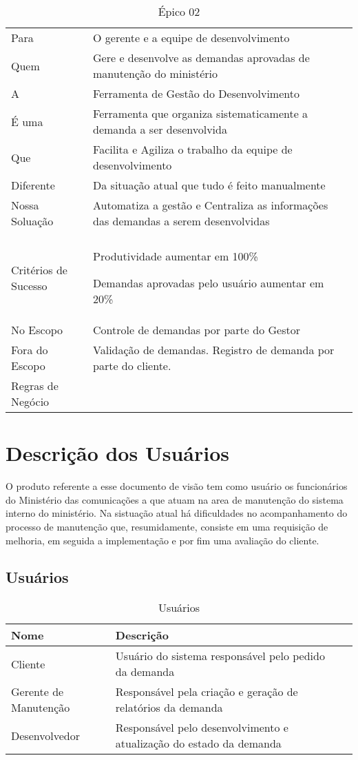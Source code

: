 \begin{table}[H]
	\begin{tabular}{|>{\raggedright}p{4cm}|>{\raggedright}p{10cm}|}
		\hline 
		\multicolumn{2}{|c|}{Caso de Negócio}\tabularnewline
		\hline 
		Para & O gerente e a equipe de desenvolvimento\tabularnewline
		\hline 
		Quem & Gere e desenvolve as demandas aprovadas de manutenção do ministério\tabularnewline
		\hline 
		A & Ferramenta de Gestão do Desenvolvimento\tabularnewline
		\hline 
		É uma & Ferramenta que organiza sistematicamente a demanda a ser desenvolvida\tabularnewline
		\hline 
		Que & Facilita e Agiliza o trabalho da equipe de desenvolvimento\tabularnewline
		\hline 
		Diferente & Da situação atual que tudo é feito manualmente\tabularnewline
		\hline 
		Nossa Soluação & Automatiza a gestão e Centraliza as informações das demandas a serem
		desenvolvidas\tabularnewline
		\hline 
		\multicolumn{2}{|c|}{Escopo}\tabularnewline
		\hline 
		Critérios de Sucesso & Produtividade aumentar em 100\%

		Demandas aprovadas pelo usuário aumentar em 20\%\tabularnewline
		\hline 
		No Escopo & Controle de demandas por parte do Gestor\tabularnewline
		\hline 
		Fora do Escopo & Validação de demandas. Registro de demanda por parte do cliente.\tabularnewline
		\hline 
		Regras de Negócio & \tabularnewline
		\hline
	\end{tabular}
	\caption{Épico 02}
	\label{Epico_02}
\end{table}

\section{Descrição dos Usuários}

O produto referente a esse documento de visão tem como usuário os funcionários do Ministério das comunicações a que atuam na area de manutenção do sistema interno do ministério. Na sistuação atual  há dificuldades no acompanhamento do processo de manutenção que, resumidamente, consiste em uma requisição de melhoria, em seguida a implementação e por fim uma avaliação do cliente. 

\subsection{Usuários}

\begin{table}[H]
	\begin{tabular}{|l| p{7cm} | p{6cm} |}
		\hline
		\textbf{Nome} & \textbf{Descrição}\tabularnewline
		\hline
		Cliente & Usuário do sistema responsável pelo pedido da demanda\tabularnewline
		\hline
		Gerente de Manutenção & Responsável pela criação e geração de relatórios da demanda\tabularnewline
		\hline
		Desenvolvedor & Responsável pelo desenvolvimento e atualização do estado da demanda\tabularnewline
		\hline
	\end{tabular}
	\caption{Usuários}
	\label{Usuarios}
\end{table}

